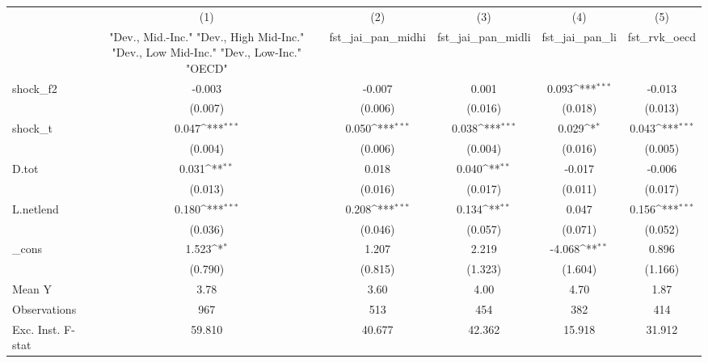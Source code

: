 {
\def\sym#1{\ifmmode^{#1}\else\(^{#1}\)\fi}
\begin{tabular}{l*{5}{c}}
\toprule
            &\multicolumn{1}{c}{(1)}&\multicolumn{1}{c}{(2)}&\multicolumn{1}{c}{(3)}&\multicolumn{1}{c}{(4)}&\multicolumn{1}{c}{(5)}\\
            &\multicolumn{1}{c}{ "Dev., Mid.-Inc." "Dev., High Mid-Inc." "Dev., Low Mid-Inc." "Dev., Low-Inc." "OECD" }&\multicolumn{1}{c}{fst\_jai\_pan\_midhi}&\multicolumn{1}{c}{fst\_jai\_pan\_midli}&\multicolumn{1}{c}{fst\_jai\_pan\_li}&\multicolumn{1}{c}{fst\_rvk\_oecd}\\
\midrule
shock\_f2    &      -0.003         &      -0.007         &       0.001         &       0.093\sym{***}&      -0.013         \\
            &     (0.007)         &     (0.006)         &     (0.016)         &     (0.018)         &     (0.013)         \\
\addlinespace
shock\_t     &       0.047\sym{***}&       0.050\sym{***}&       0.038\sym{***}&       0.029\sym{*}  &       0.043\sym{***}\\
            &     (0.004)         &     (0.006)         &     (0.004)         &     (0.016)         &     (0.005)         \\
\addlinespace
D.tot       &       0.031\sym{**} &       0.018         &       0.040\sym{**} &      -0.017         &      -0.006         \\
            &     (0.013)         &     (0.016)         &     (0.017)         &     (0.011)         &     (0.017)         \\
\addlinespace
L.netlend   &       0.180\sym{***}&       0.208\sym{***}&       0.134\sym{**} &       0.047         &       0.156\sym{***}\\
            &     (0.036)         &     (0.046)         &     (0.057)         &     (0.071)         &     (0.052)         \\
\addlinespace
\_cons      &       1.523\sym{*}  &       1.207         &       2.219         &      -4.068\sym{**} &       0.896         \\
            &     (0.790)         &     (0.815)         &     (1.323)         &     (1.604)         &     (1.166)         \\
\midrule
Mean Y      &        3.78         &        3.60         &        4.00         &        4.70         &        1.87         \\
Observations&         967         &         513         &         454         &         382         &         414         \\
Exc. Inst. F-stat&      59.810         &      40.677         &      42.362         &      15.918         &      31.912         \\
\bottomrule
\end{tabular}
}
